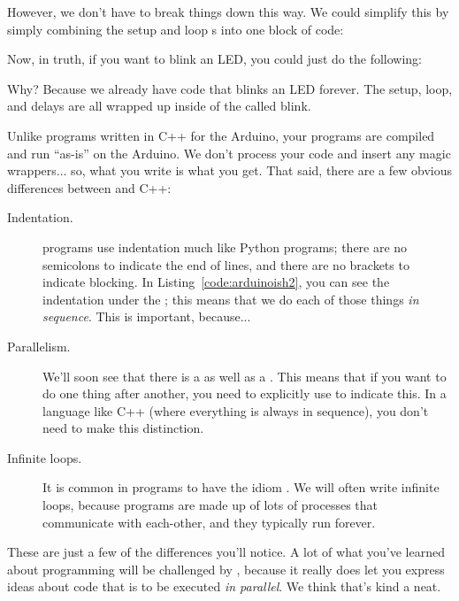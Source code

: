 

However, we don't have to break things down this way. We could simplify this by simply combining the {\code setup} and {\code loop} {\PROC}s into one block of code:



Now, in truth, if you want to blink an LED, you could just do the following:



Why? Because we already have code that blinks an LED forever. The setup, loop, and delays are all wrapped up inside of the \PROC called {\code blink}.

\discussion

Unlike programs written in C++ for the Arduino, your \occam programs are compiled and run ``as-is'' on the Arduino. We don't process your code and insert any magic wrappers... so, what you write is what you get. That said, there are a few obvious differences between \occam and C++:

\begin{description}
	\item[Indentation.] \occam programs use indentation much like Python programs; there are no semicolons to indicate the end of lines, and there are no brackets to indicate blocking. In Listing~\ref{code:arduinoish2}, you can see the indentation under the \SEQ; this means that we do each of those things \emph{in sequence}. This is important, because...
	\item[Parallelism.] We'll soon see that there is a \PAR as well as a \SEQ. This means that if you want to do one thing after another, you need to explicitly use \SEQ to indicate this. In a language like C++ (where everything is always in sequence), you don't need to make this distinction.
	\item[Infinite loops.] It is common in \occam programs to have the idiom \WHILETRUE. We will often write infinite loops, because \occam programs are made up of lots of processes that communicate with each-other, and they typically run forever.
\end{description}

These are just a few of the differences you'll notice. A lot of what you've learned about programming will be challenged by \occam, because it really does let you express ideas about code that is to be executed \emph{in parallel}. We think that's kind a neat.

